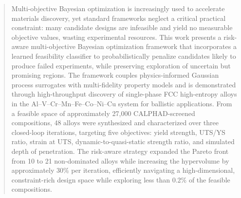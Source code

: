 \documentclass[letterpaper,4pt,times,preprint]{elsarticle}
\begin{document}
\begin{frontmatter}


\begin{abstract}


Multi-objective Bayesian optimization is increasingly used to accelerate materials discovery, yet standard frameworks neglect a critical practical constraint: many candidate designs are infeasible and yield no measurable objective values, wasting experimental resources. This work presents a risk-aware multi-objective Bayesian optimization framework that incorporates a learned feasibility classifier to probabilistically penalize candidates likely to produce failed experiments, while preserving exploration of uncertain but promising regions. The framework couples physics-informed Gaussian process surrogates with multi-fidelity property models and is demonstrated through high-throughput discovery of single-phase FCC high-entropy alloys in the Al--V--Cr--Mn--Fe--Co--Ni--Cu system for ballistic applications. From a feasible space of approximately 27{,}000 CALPHAD-screened compositions, 48 alloys were synthesized and characterized over three closed-loop iterations, targeting five objectives: yield strength, UTS/YS ratio, strain at UTS, dynamic-to-quasi-static strength ratio, and simulated depth of penetration. The risk-aware strategy expanded the Pareto front from 10 to 21 non-dominated alloys while increasing the hypervolume by approximately 30\% per iteration, efficiently navigating a high-dimensional, constraint-rich design space while exploring less than 0.2\% of the feasible compositions.


\end{abstract}

\begin{keyword}

\end{keyword}
\end{frontmatter}



\end{document}
